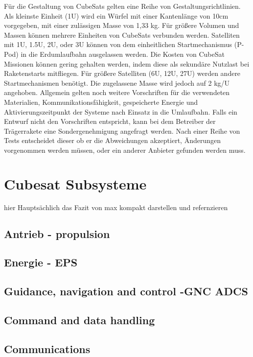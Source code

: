 	
	\begin{flushleft}
Für die Gestaltung von CubeSats gelten eine Reihe von Gestaltungsrichtlinien. Als kleinste Einheit (1U) wird ein Würfel mit einer Kantenlänge von 10cm vorgegeben, mit einer zulässigen Masse von 1,33 kg. Für größere Volumen und Massen können mehrere Einheiten von CubeSats verbunden werden. Satelliten mit 1U, 1.5U, 2U, oder 3U können von dem einheitlichen Startmechanismus (P-Pod) in die Erdumlaufbahn ausgelassen werden. Die Kosten von CubeSat Missionen können gering gehalten werden, indem diese als sekundäre Nutzlast bei Raketenstarts mitfliegen. Für größere Satelliten (6U, 12U, 27U) werden andere Startmechanismen benötigt. Die zugelassene Masse wird jedoch auf 2 kg/U angehoben. Allgemein gelten noch weitere Vorschriften für die verwendeten  Materialien, Kommunikationsfähigkeit, gespeicherte Energie und Aktivierungszeitpunkt der Systeme nach Einsatz in die Umlaufbahn.
Falls ein Entwurf nicht den Vorschriften entspricht, kann bei dem Betreiber der Trägerrakete eine Sondergenehmigung angefragt werden. Nach einer Reihe von Tests entscheidet dieser ob er die Abweichungen akzeptiert, Änderungen vorgenommen werden müssen, oder ein anderer Anbieter gefunden werden muss. 
	\end{flushleft}

			
	\section{Cubesat Subsysteme}
	hier Hauptsächlich das Fazit von max kompakt darstellen und refernzieren
		\subsection{Antrieb - propulsion}
		\subsection{Energie - EPS}
		\subsection{Guidance, navigation and control -GNC ADCS}
		\subsection{Command and data handling}
		\subsection{Communications}
